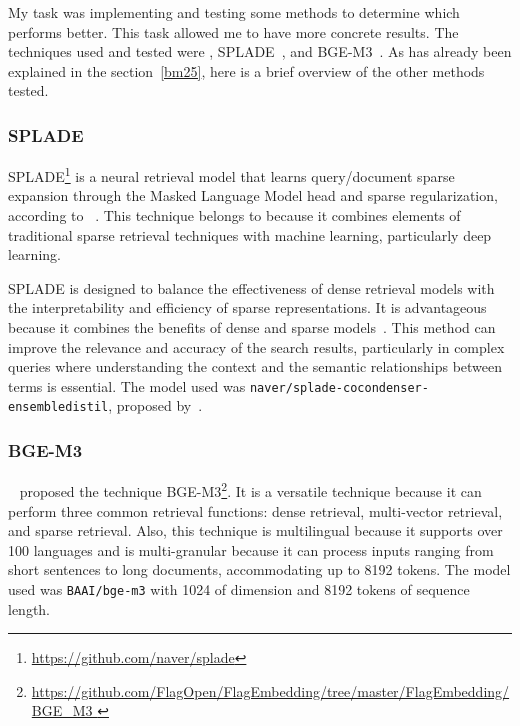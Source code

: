 My task was implementing and testing some {\ir} methods to determine which performs better. This task allowed me to have more concrete results. The techniques used and tested were {\bm}, SPLADE~\cite{formal_splade_2021}, and BGE-M3~\cite{chen_bge_2024}. As {\bm} has already been explained in the section~\ref{bm25}, here is a brief overview of the other methods tested.


\subsubsection{SPLADE} 

SPLADE\footnote{\url{https://github.com/naver/splade}} is a neural retrieval model that learns query/document sparse expansion through the {\bert} Masked Language Model head and sparse regularization, according to~\citet{formal_splade_2021} . This technique belongs to {\lsr} because it combines elements of traditional sparse retrieval techniques with machine learning, particularly deep learning. 

SPLADE is designed to balance the effectiveness of dense retrieval models with the interpretability and efficiency of sparse representations. It is advantageous  because it combines the benefits of dense and sparse models~\cite{formal_splade_2021}. This method can improve the relevance and accuracy of the search results, particularly in complex queries where understanding the context and the semantic relationships between terms is essential. The model used was \texttt{naver/splade-cocondenser-ensembledistil}, proposed by~\citet{formal_distillation_2022}.



\subsubsection{BGE-M3} 

~\citet{chen_bge_2024} proposed the technique BGE-M3\footnote{\url{https://github.com/FlagOpen/FlagEmbedding/tree/master/FlagEmbedding/BGE_M3 }}. It is a versatile technique because it can perform three common retrieval functions: dense retrieval, multi-vector retrieval, and sparse retrieval. Also, this technique is multilingual because it supports over 100 languages and is multi-granular because it can process inputs ranging from short sentences to long documents, accommodating up to 8192 tokens. The model used was \texttt{BAAI/bge-m3} with 1024 of dimension and 8192 tokens of sequence length.





